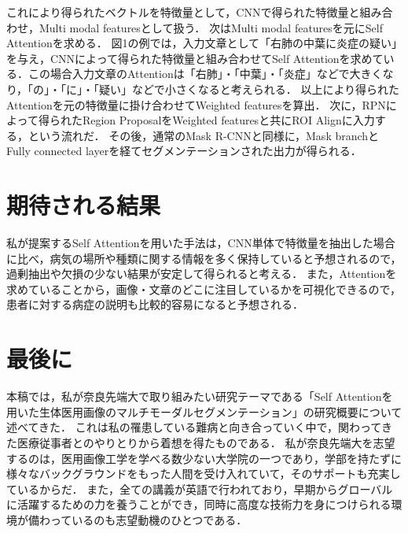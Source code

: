 \documentclass[a4j,10pt,twocolumn]{jarticle}
\begin{document}
これにより得られたベクトルを特徴量として，CNNで得られた特徴量と組み合わせ，Multi modal featuresとして扱う．
次はMulti modal featuresを元にSelf Attentionを求める．
図1の例では，入力文章として「右肺の中葉に炎症の疑い」を与え，CNNによって得られた特徴量と組み合わせてSelf Attentionを求めている．この場合入力文章のAttentionは「右肺」・「中葉」・「炎症」などで大きくなり，「の」・「に」・「疑い」などで小さくなると考えられる．
以上により得られたAttentionを元の特徴量に掛け合わせてWeighted featuresを算出．
次に，RPN\cite{ren2015faster}によって得られたRegion ProposalをWeighted featuresと共にROI Alignに入力する，という流れだ．
その後，通常のMask R-CNNと同様に，Mask branchとFully connected layerを経てセグメンテーションされた出力が得られる．
\section{期待される結果}
私が提案するSelf Attentionを用いた手法は，CNN単体で特徴量を抽出した場合に比べ，病気の場所や種類に関する情報を多く保持していると予想されるので，過剰抽出や欠損の少ない結果が安定して得られると考える．
また，Attentionを求めていることから，画像・文章のどこに注目しているかを可視化できるので，患者に対する病症の説明も比較的容易になると予想される．

\section{最後に}
本稿では，私が奈良先端大で取り組みたい研究テーマである「Self Attentionを用いた生体医用画像のマルチモーダルセグメンテーション」の研究概要について述べてきた．
これは私の罹患している難病と向き合っていく中で，関わってきた医療従事者とのやりとりから着想を得たものである．
私が奈良先端大を志望するのは，医用画像工学を学べる数少ない大学院の一つであり，学部を持たずに様々なバックグラウンドをもった人間を受け入れていて，そのサポートも充実しているからだ．
また，全ての講義が英語で行われており，早期からグローバルに活躍するための力を養うことができ，同時に高度な技術力を身につけられる環境が備わっているのも志望動機のひとつである．



\end{document}
